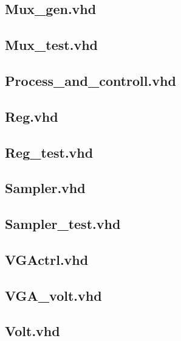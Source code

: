 \documentclass[10pt,spanish,a4paper,openany,notitlepage]{article}
\begin{document}
\subsection{Mux\_gen.vhd}

\newpage

\subsection{Mux\_test.vhd}

\newpage

\subsection{Process\_and\_controll.vhd}

\newpage

\subsection{Reg.vhd}

\newpage

\subsection{Reg\_test.vhd}

\newpage

\subsection{Sampler.vhd}

\newpage

\subsection{Sampler\_test.vhd}

\newpage

\subsection{VGActrl.vhd}

\newpage

\subsection{VGA\_volt.vhd}

\newpage

\subsection{Volt.vhd}

\newpage
\end{document}
